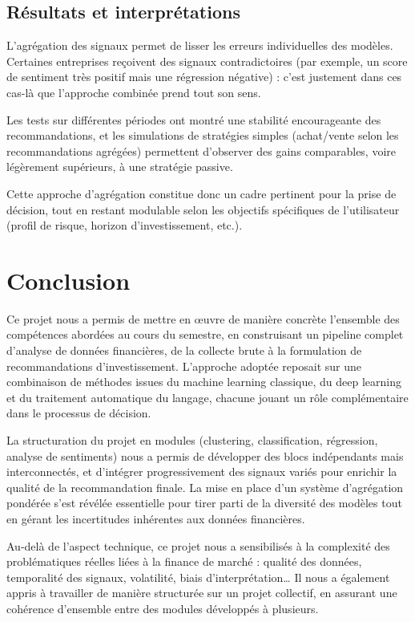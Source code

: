 \documentclass[a4paper,12pt]{article}
\begin{document}
\subsection*{Résultats et interprétations}

L’agrégation des signaux permet de lisser les erreurs individuelles des modèles. Certaines entreprises reçoivent des signaux contradictoires (par exemple, un score de sentiment très positif mais une régression négative) : c’est justement dans ces cas-là que l’approche combinée prend tout son sens.

Les tests sur différentes périodes ont montré une stabilité encourageante des recommandations, et les simulations de stratégies simples (achat/vente selon les recommandations agrégées) permettent d’observer des gains comparables, voire légèrement supérieurs, à une stratégie passive.

Cette approche d’agrégation constitue donc un cadre pertinent pour la prise de décision, tout en restant modulable selon les objectifs spécifiques de l’utilisateur (profil de risque, horizon d’investissement, etc.).

\section{Conclusion}

Ce projet nous a permis de mettre en œuvre de manière concrète l’ensemble des compétences abordées au cours du semestre, en construisant un pipeline complet d’analyse de données financières, de la collecte brute à la formulation de recommandations d’investissement. L’approche adoptée reposait sur une combinaison de méthodes issues du machine learning classique, du deep learning et du traitement automatique du langage, chacune jouant un rôle complémentaire dans le processus de décision.

La structuration du projet en modules (clustering, classification, régression, analyse de sentiments) nous a permis de développer des blocs indépendants mais interconnectés, et d’intégrer progressivement des signaux variés pour enrichir la qualité de la recommandation finale. La mise en place d’un système d’agrégation pondérée s’est révélée essentielle pour tirer parti de la diversité des modèles tout en gérant les incertitudes inhérentes aux données financières.

Au-delà de l’aspect technique, ce projet nous a sensibilisés à la complexité des problématiques réelles liées à la finance de marché : qualité des données, temporalité des signaux, volatilité, biais d’interprétation… Il nous a également appris à travailler de manière structurée sur un projet collectif, en assurant une cohérence d’ensemble entre des modules développés à plusieurs.
\end{document}
